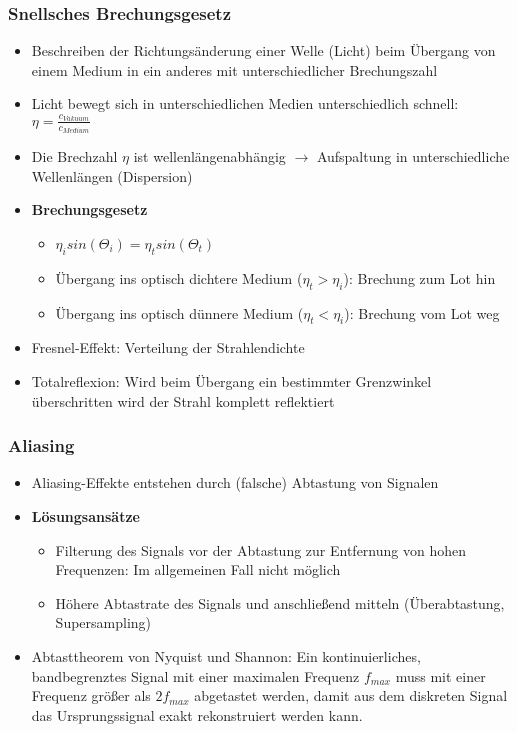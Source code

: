\subsubsection{Snellsches Brechungsgesetz}
\begin{itemize}
	\item Beschreiben der Richtungsänderung einer Welle (Licht) beim Übergang von einem Medium in ein anderes mit unterschiedlicher Brechungszahl
	\item Licht bewegt sich in unterschiedlichen Medien unterschiedlich schnell: \(\eta = \frac{c_{Vakuum}}{c_{Medium}}\)
	\item Die Brechzahl \(\eta\) ist wellenlängenabhängig \(\rightarrow\) Aufspaltung in unterschiedliche Wellenlängen (Dispersion)
	\item \textbf{Brechungsgesetz}
	\begin{itemize}
		\item \(\eta_i sin(\Theta_i) = \eta_t sin(\Theta_t)\)
		\item Übergang ins optisch dichtere Medium (\(\eta_t > \eta_i\)): Brechung zum Lot hin
		\item Übergang ins optisch dünnere Medium (\(\eta_t < \eta_i\)): Brechung vom Lot weg
	\end{itemize}
	\item Fresnel-Effekt: Verteilung der Strahlendichte
	\item Totalreflexion: Wird beim Übergang ein bestimmter Grenzwinkel überschritten wird der Strahl komplett reflektiert
\end{itemize}

\subsubsection{Aliasing}
\begin{itemize}
	\item Aliasing-Effekte entstehen durch (falsche) Abtastung von Signalen
	\item \textbf{Lösungsansätze}
	\begin{itemize}
		\item Filterung des Signals vor der Abtastung zur Entfernung von hohen Frequenzen: Im allgemeinen Fall nicht möglich
		\item Höhere Abtastrate des Signals und anschließend mitteln (Überabtastung, Supersampling)
	\end{itemize}
	\item Abtasttheorem von Nyquist und Shannon: Ein kontinuierliches, bandbegrenztes Signal mit einer maximalen Frequenz \(f_{max}\) muss mit einer Frequenz größer als \(2f_{max}\) abgetastet werden, damit aus dem diskreten Signal das Ursprungssignal exakt rekonstruiert werden kann.
\end{itemize}

